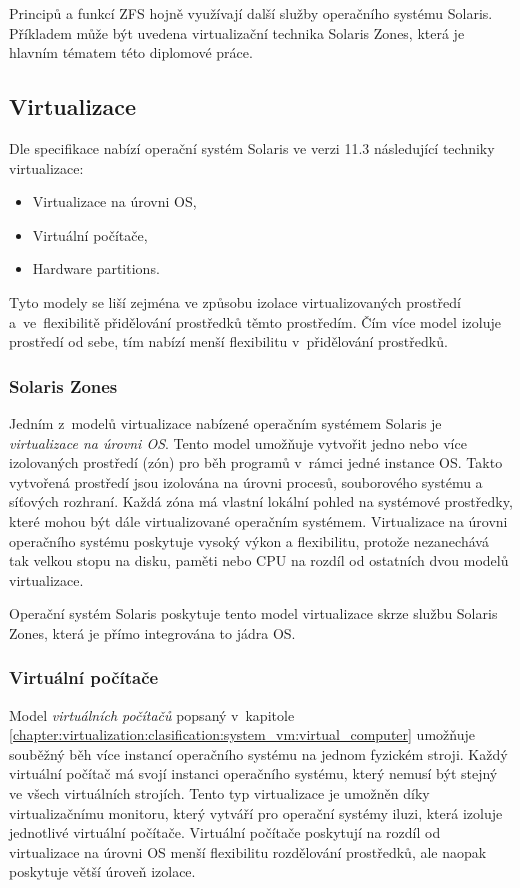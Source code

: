 Principů a funkcí ZFS hojně využívají další služby operačního systému Solaris. Příkladem může být uvedena virtualizační technika
Solaris Zones, která je hlavním tématem této diplomové práce.
\subsection{Virtualizace}
\label{chapter:solaris:virtualization}
Dle specifikace \cite{oracle:solaris:virtualization} nabízí operační systém Solaris ve verzi 11.3 následující techniky virtualizace:
\begin{itemize}
 \item Virtualizace na úrovni OS,
 \item Virtuální počítače,
 \item Hardware partitions.
\end{itemize}
Tyto modely se liší zejména ve způsobu izolace virtualizovaných prostředí a~ve~flexibilitě přidělování prostředků těmto
prostředím. Čím více model izoluje prostředí od sebe, tím nabízí menší flexibilitu v~přidělování prostředků.
\subsubsection{Solaris Zones}
\label{chapter:solaris:virtualization:szones}
Jedním z~modelů virtualizace nabízené operačním systémem Solaris je \textit{virtualizace na úrovni OS}. Tento model umožňuje
vytvořit jedno nebo více izolovaných prostředí (zón) pro běh programů v~rámci jedné instance OS. Takto vytvořená prostředí
jsou izolována na úrovni procesů, souborového systému a síťových rozhraní. Každá zóna má vlastní lokální pohled na systémové
prostředky, které mohou být dále virtualizované operačním systémem. Virtualizace na úrovni operačního systému poskytuje vysoký
výkon a flexibilitu, protože nezanechává tak velkou stopu na disku, paměti nebo CPU na rozdíl od ostatních dvou modelů virtualizace. 

Operační systém Solaris poskytuje tento model virtualizace skrze službu Solaris Zones, která je přímo integrována to jádra OS.
\subsubsection{Virtuální počítače}
\label{chapter:solaris:virtualization:vm}
Model \textit{virtuálních počítačů} popsaný v~kapitole \ref{chapter:virtualization:clasification:system_vm:virtual_computer} 
umožňuje souběžný běh více instancí operačního systému na jednom fyzickém stroji. Každý virtuální počítač má svojí instanci
operačního systému, který nemusí být stejný ve všech virtuálních strojích. Tento typ virtualizace je umožněn díky virtualizačnímu
monitoru, který vytváří pro operační systémy iluzi, která izoluje jednotlivé virtuální počítače. Virtuální počítače poskytují na rozdíl od
virtualizace na úrovni OS menší flexibilitu rozdělování prostředků, ale naopak poskytuje větší úroveň izolace.

